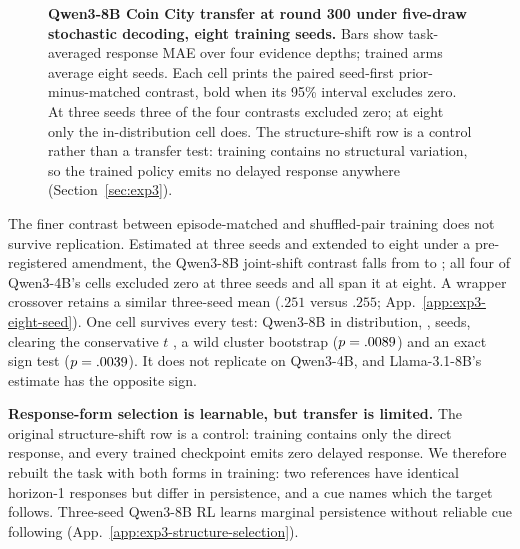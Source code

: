 \documentclass{article}
\begin{document}
\begin{figure}[!ht]
{%
}
\caption{\textbf{Qwen3-8B Coin City transfer at round 300 under five-draw
stochastic decoding, eight training seeds.} Bars show task-averaged response MAE
over four evidence depths; trained arms average eight seeds. Each cell prints the
paired seed-first prior-minus-matched contrast, bold when its 95\% interval
excludes zero. At three seeds three of the four contrasts excluded zero; at eight
only the in-distribution cell does. The structure-shift row is a control rather than
a transfer test: training contains no structural variation, so the trained policy
emits no delayed response anywhere (Section~\ref{sec:exp3}).}
\label{fig:exp3-transfer-results}
\vspace{10pt}
\end{figure}

The finer contrast between episode-matched and shuffled-pair training does not
survive replication. Estimated at three seeds and extended to eight under a
pre-registered amendment, the Qwen3-8B joint-shift contrast falls from
\ePubEightJointEst{} \ePubEightJointCi{} to \eEightJointEst{} \eEightJointCi{};
all four of Qwen3-4B's cells excluded zero at three seeds and all span it at
eight. A wrapper crossover retains a similar three-seed mean ($.251$ versus $.255$;
App.~\ref{app:exp3-eight-seed}). One cell survives every test: Qwen3-8B in distribution,
\eEightIdEst{} \eEightIdCi{}, \eEightIdSign{} seeds, clearing the conservative
$t$ \eEightIdTci{}, a wild cluster bootstrap ($p=.0089{}$) and an exact
sign test ($p=.0039{}$). It does not replicate on Qwen3-4B, and
Llama-3.1-8B's estimate has the opposite sign.

\noindent\textbf{Response-form selection is learnable, but transfer is limited.}
The original structure-shift row is a control: training contains only the direct
response, and every trained checkpoint emits zero delayed response. We therefore
rebuilt the task with both forms in training: two references have identical
horizon-1 responses but differ in persistence, and a cue names which the target
follows. Three-seed Qwen3-8B RL learns marginal persistence without reliable cue
following (App.~\ref{app:exp3-structure-selection}).
\end{document}
